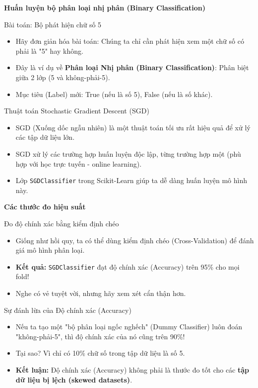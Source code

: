 \documentclass[aspectratio=169]{beamer}
\begin{document}
\begin{frame}
\vfill\centering\LARGE\textbf{Huấn luyện bộ phân loại nhị phân (Binary Classification)}\vfill
\end{frame}

\begin{frame}{Bài toán: Bộ phát hiện chữ số 5}
\begin{itemize}
    \item Hãy đơn giản hóa bài toán: Chúng ta chỉ cần phát hiện xem một chữ số có phải là "5" hay không.
    \item Đây là ví dụ về \textbf{Phân loại Nhị phân (Binary Classification)}: Phân biệt giữa 2 lớp (5 và không-phải-5).
    \item Mục tiêu (Label) mới: True (nếu là số 5), False (nếu là số khác).
\end{itemize}
\end{frame}

\begin{frame}{Thuật toán Stochastic Gradient Descent (SGD)}
\begin{itemize}
    \item SGD (Xuống dốc ngẫu nhiên) là một thuật toán tối ưu rất hiệu quả để xử lý các tập dữ liệu lớn.
    \item SGD xử lý các trường hợp huấn luyện độc lập, từng trường hợp một (phù hợp với học trực tuyến - online learning).
    \item Lớp \texttt{SGDClassifier} trong Scikit-Learn giúp ta dễ dàng huấn luyện mô hình này.
\end{itemize}
\end{frame}

\begin{frame}
\vfill\centering\LARGE\textbf{Các thước đo hiệu suất}\vfill
\end{frame}

\begin{frame}{Đo độ chính xác bằng kiểm định chéo}
\begin{itemize}
    \item Giống như hồi quy, ta có thể dùng kiểm định chéo (Cross-Validation) để đánh giá mô hình phân loại.
    \item \textbf{Kết quả:} \texttt{SGDClassifier} đạt độ chính xác (Accuracy) trên 95\% cho mọi fold!
    \item Nghe có vẻ tuyệt vời, nhưng hãy xem xét cẩn thận hơn.
\end{itemize}
\end{frame}

\begin{frame}{Sự đánh lừa của Độ chính xác (Accuracy)}
\begin{itemize}
    \item Nếu ta tạo một "bộ phân loại ngốc nghếch" (Dummy Classifier) luôn đoán "không-phải-5", thì độ chính xác của nó cũng trên 90\%!
    \item Tại sao? Vì chỉ có 10\% chữ số trong tập dữ liệu là số 5.
    \item \textbf{Kết luận:} Độ chính xác (Accuracy) không phải là thước đo tốt cho các \textbf{tập dữ liệu bị lệch (skewed datasets)}.
\end{itemize}
\end{frame}
\end{document}
